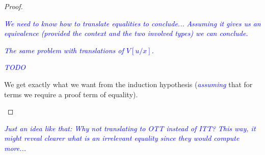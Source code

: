 \documentclass{amsart}
\newcommand\meta[1]{\noindent\textcolor{blue}{\emph{#1}}}
\begin{document}
\begin{proof}
\begin{caselist}
    \nextcase
    \begin{mathc}
    \end{mathc}
    \meta{We need to know how to translate equalities to conclude...}
    \meta{Assuming it gives us an equivalence (provided the context and the two
    involved types) we can conclude.}

    \nextcase
    \begin{mathc}
    \end{mathc}
    \meta{The same problem with translations of $V[u/x]$.}

    \nextcase
    \begin{mathc}
    \end{mathc}
    \meta{TODO}

    \nextcase
    \begin{mathc}
    \end{mathc}
    We get exactly what we want from the induction hypothesis (\meta{assuming}
    that for terms we require a proof term of equality).
  \end{caselist}
\end{proof}

\meta{Just an idea like that: Why not translating to OTT instead of ITT? This
way, it might reveal clearer what is an irrelevant equality since they would
compute more...}
\end{document}

